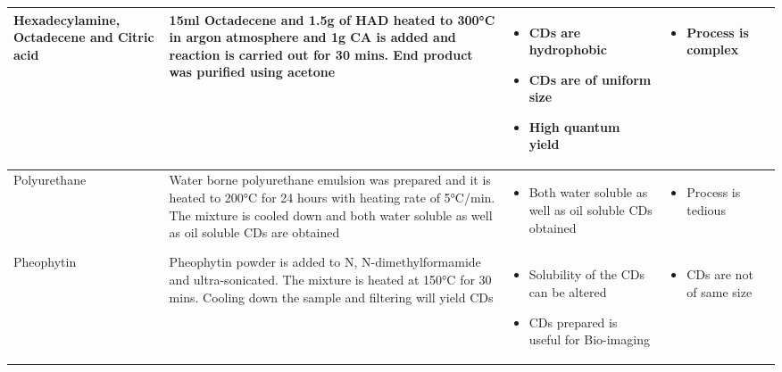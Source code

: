 \documentclass[12pt]{article}
\begin{document}
\begin{center}
\begin{longtable}{|p{3cm}|p{3cm}|p{3cm}|p{3cm}|p{2.1cm}|}
Hexadecylamine, Octadecene and Citric acid &
15ml Octadecene and 1.5g of HAD heated to 300\si{\degree}C in argon atmosphere and 1g CA is added and reaction is carried out for 30 mins. End product was purified using acetone	&
\begin{itemize}
	\item{CDs are hydrophobic}
	\item{CDs are of uniform size}
	\item{High quantum yield}
\end{itemize}
&
\begin{itemize}
	\item{Process is complex}
\end{itemize}
&
\cite{wang2010one}\cite{panniello2017luminescent}
\\
\hline
Polyurethane &
Water borne polyurethane emulsion was  prepared and it is heated to 200°C for 24 hours with heating rate of 5\si{\degree}C/min. The mixture is cooled down and both water soluble as well as oil soluble CDs are obtained &
\begin{itemize}
	\item {Both water soluble as well as oil soluble CDs obtained}
\end{itemize} &
\begin{itemize}
	\item {Process is tedious}
\end{itemize} &
\cite{gu2016one}\\
\hline
Pheophytin &
Pheophytin powder is added to N, N-dimethylformamide and ultra-sonicated. The mixture is heated at 150°C for 30 mins. Cooling down the sample and filtering will yield CDs & 
\begin{itemize} 
	\item{Solubility of the CDs can be altered}
	\item{CDs prepared is useful for Bio-imaging}
\end{itemize}&
\begin{itemize}
	\item {CDs are not of same size}
\end{itemize}&
\cite{wen2019pheophytin}\\
\hline

\end{longtable}
\end{center}
\end{document}
